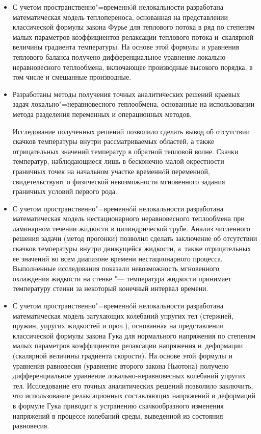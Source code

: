 \begin{itemize}



\item[1.] С учетом пространственно"=временн\'{o}й нелокальности разработана математическая модель теплопереноса, основанная на представлении классической формулы закона Фурье для теплового потока в ряд по степеням малых параметров коэффициентов релаксации теплового потока и~скалярной величины градиента температуры. На основе этой формулы и уравнения теплового баланса получено дифференциальное уравнение локально-неравновесного теплообмена, включающее производные высокого порядка, в том числе и смешанные производные.



\item[2.] Разработаны методы получения точных аналитических решений краевых задач локально"=неравновесного теплообмена, основанные на использовании метода разделения переменных и операционных методов. 

Исследование полученных решений позволило сделать вывод об отсутствии скачков температуры внутри рассматриваемых областей, а также отрицательных значений температур в обратной тепловой волне. Скачки температур, наблюдающиеся лишь в бесконечно малой окрестности граничных точек на начальном участке временн\'{o}й переменной, свидетельствуют о физической невозможности мгновенного задания граничных условий первого рода.



\item[3.] С учетом пространственно"=временн\'{o}й нелокальности разработана математическая модель нестационарного неравновесного теплообмена при ламинарном течении жидкости в цилиндрической трубе. Анализ численного решения задачи (метод прогонки) позволил сделать заключение об отсутствии скачков температуры внутри движущейся жидкости, а~также отрицательных ее значений во всем диапазоне времени нестационарного процесса. Выполненные исследования показали невозможность мгновенного охлаждения жидкости на стенке "--- температура жидкости принимает температуру стенки за некоторый конечный интервал времени.



\item[4.] С учетом пространственно"=временн\'{o}й нелокальности разработана математическая модель затухающих колебаний упругих тел (стержней, пружин, упругих жидкостей и проч.), основанная на представлении классической формулы закона Гука для нормального напряжения по степеням малых параметров коэффициентов релаксации напряжения и~деформации (скалярной величины градиента скорости). На основе этой формулы и уравнения равновесия (уравнение второго закона Ньютона) получено дифференциальное уравнение локально-неравновесных колебаний упругих тел. Исследование его точных аналитических решений позволило заключить, что использование релаксационных составляющих напряжений и деформаций в формуле Гука приводит к устранению скачкообразного изменения напряжений в процессе колебаний среды, выведенной из состояния равновесия.




\end{itemize}
